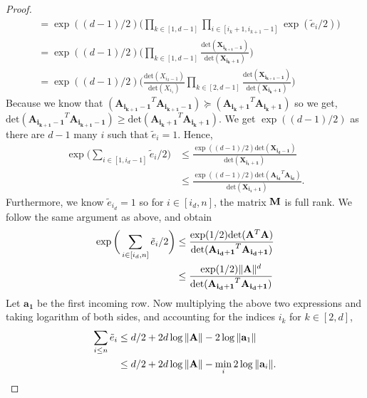 \begin{proof}{\label{proof:onlineSummationBound}}
\begin{align*}
 & = \exp((d-1)/2)\Big(\prod_{k\in [1,d-1]} \prod_{i\in[i_k+1, i_{k+1}-1]} \exp(\tilde{e}_{i}/2)\Big) \\
 & =  \exp((d-1)/2)\Big(\prod_{k\in [1,d-1]}\frac{\mbox{det}(\mathbf{X_{i_{k+1}-1}})}{\mbox{det}(\mathbf{X_{i_k+1}})}\Big)  \\ &=  \exp((d-1)/2)\Big(\frac{\mbox{det}(X_{i_{2}-1})}{\mbox{det}(X_{i_{1}})}\prod_{k\in [2,d-1]} \frac{\mbox{det}(\mathbf{X_{i_{k+1}-1}})}{\mbox{det}(\mathbf{X_{i_k+1}})}\Big)
 \end{align*}
 Because we know that $(\mathbf{A_{i_{k+1}-1}}^T \mathbf{A_{i_{k+1}-1}}) \succeq (\mathbf{A_{i_k+1}}^T \mathbf{A_{i_k+1}})$ so we get,
 $\mbox{det}(\mathbf{A_{i_{k+1}-1}}^T \mathbf{A_{i_{k+1}-1}}) \ge \mbox{det}(\mathbf{A_{i_k+1}}^T \mathbf{A_{i_k+1}})$. We get $\exp((d-1)/2)$ as there are $d-1$ many $i$ such that $\tilde{e}_{i} =1$. Hence, 
 \begin{align*}
     \exp\bigg(\sum_{i\in [1, i_{d}-1]} \tilde{e}_{i}/2\bigg) &\le \frac{\exp((d-1)/2)\mbox{det}(\mathbf{X_{i_{d}-1}})}{\mbox{det}(\mathbf{X_{i_1+1}})}\\ 
     &\le \frac{\exp((d-1)/2)\mbox{det}(\mathbf{A_{i_d}}^T \mathbf{A_{i_d}})}{\mbox{det}(\mathbf{X_{i_1+1}})}.
 \end{align*}
 Furthermore, we know $\tilde{e}_{i_d}=1$ so for $i\in [i_d, n]$, the matrix $\mathbf{M}$ is full rank. We follow the same argument as above, and obtain
 \begin{align*}
 \exp\bigg(\sum_{i\in [i_d, n]} \tilde{e}_{i}/2\bigg) &\le \frac{\exp(1/2)\mbox{det}(\mathbf{A}^T \mathbf{A})}{\mbox{det}(\mathbf{A_{i_d+1}}^T \mathbf{A_{i_d+1}})}\\
 & \le \frac{\exp(1/2)\|\mathbf{A}\|^d}{\mbox{det}(\mathbf{A_{i_d+1}}^T \mathbf{A_{i_d+1}})} 
 \end{align*}
Let $\mathbf{a_{1}}$ be the first incoming row. Now multiplying the above two expressions and taking logarithm of both sides, and accounting for the indices $i_k$ for $k\in[2,d]$,
\begin{align*}
    \sum_{i\le n} \tilde{e}_i &\le d/2 + 2 d\log\|\*A\| - 2\log \|\*a_{1}\| \\
    &\le d/2 + 2 d\log\|\*A\| - \min_{i}2\log \|\*a_{i}\|. 

\end{align*}
\end{proof}
